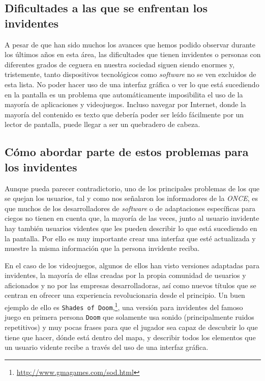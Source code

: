 \subsection{Dificultades a las que se enfrentan los invidentes}

A pesar de que han sido muchos los avances que hemos podido observar durante los últimos años en esta área, las dificultades que tienen invidentes o personas con diferentes grados de ceguera en nuestra sociedad siguen siendo enormes y, tristemente, tanto dispositivos tecnológicos como \textit{software} no se ven excluidos de esta lista.
No poder hacer uso de una interfaz gráfica o ver lo que está sucediendo en la pantalla es un problema que automáticamente imposibilita el uso de la mayoría de aplicaciones y videojuegos. Incluso navegar por Internet, donde la mayoría del contenido es texto que debería poder ser leído fácilmente por un lector de pantalla, puede llegar a ser un quebradero de cabeza.

\subsection{Cómo abordar parte de estos problemas para los invidentes}

Aunque pueda parecer contradictorio, uno de los principales problemas de los que se quejan los usuarios, tal y como nos señalaron los informadores de la \textit{ONCE}, es que muchos de los desarrolladores de \textit{software} o de adaptaciones específicas para ciegos no tienen en cuenta que, la mayoría de las veces, junto al usuario invidente hay también usuarios videntes que les pueden describir lo que está sucediendo en la pantalla. Por ello es muy importante crear una interfaz que esté actualizada y muestre la misma información que la persona invidente reciba.

En el caso de los videojuegos, algunos de ellos han visto versiones adaptadas para invidentes, la mayoría de ellas creadas por la propia comunidad de usuarios y aficionados y no por las empresas desarrolladoras, así como nuevos títulos que se centran en ofrecer una experiencia revolucionaria desde el principio. Un buen ejemplo de ello es \texttt{Shades of Doom},\footnote{\url{http://www.gmagames.com/sod.html}}, una versión para invidentes del famoso juego en primera persona \texttt{Doom} que solamente usa sonido (principalmente ruidos repetitivos) y muy pocas frases para que el jugador sea capaz de descubrir lo que tiene que hacer, dónde está dentro del mapa, y describir todos los elementos que un usuario vidente recibe a través del uso de una interfaz gráfica.

